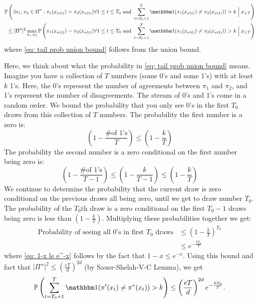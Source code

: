 \documentclass[11pt]{article}
\begin{document}
\begin{align}\label{eq: tail probability 4}
\prob{\exists \pi_1,\pi_2 \in \Pi'': \pi_1(x_{\sigma(t)})= \pi_2(x_{\sigma(t)}) \forall 1 \le t \le T_0 \text{ and }  \sum_{t=T_0+1}^T \ind(\pi_1(x_{\sigma(t)})\neq \pi_2(x_{\sigma(t)})) > k\;\Big|\;x_{1:T}} \\
\le |\Pi''|^2\max_{\pi_1,\pi_2} \prob{\pi_1(x_{\sigma(t)})= \pi_2(x_{\sigma(t)}) \forall 1 \le t \le T_0 \text{ and } \sum_{t=T_0+1}^T \ind(\pi_1(x_{\sigma(t)})\neq \pi_2(x_{\sigma(t)})) > k\;\Big|\;x_{1:T}}\label{eq: tail prob union bound}
\end{align} 
where \eqref{eq: tail prob union bound} follows from the union bound. 

Here, we think about what the probability in \eqref{eq: tail prob union bound} means. Imagine you have a collection of $T$ numbers (some 0's and some 1's) with at least $k$ 1's. Here, the 0's represent the number of agreements between $\pi_1$ and $\pi_2$, and 1's represent the number of disagreements. The stream of 0's and 1's come in a random order. We bound the probability that you only see 0's in the first $T_0$ draws from this collection of $T$ numbers. The probability the first number is a zero is:
\begin{equation}
(1-\frac{\text{\# of 1's}}{T}) \le (1- \frac{k}{T})
\end{equation}
The probability the second number is a zero conditional on the first number being zero is:
\begin{equation}
(1-\frac{\text{\# of 1's}}{T-1}) \le (1-\frac{k}{T-1}) \le (1 - \frac{k}{T})
\end{equation}
We continue to determine the probability that the current draw is zero conditional on the previous draws all being zero, until we get to draw number $T_0$. The probability of the $T_0${th} draw is a zero conditional on the first $T_0-1$ draws being zero is less than $(1-\frac{k}{T})$. Multiplying these probabilities together we get:
\begin{align}
\text{Probability of seeing all 0's in first } T_0 \text{ draws} &\le (1-\frac{k}{T})^{T_0}\\
&\le e^{-\frac{kT_0}{T}} \label{eq: 1-x le e^-x}
\end{align}
where \eqref{eq: 1-x le e^-x} follows by the fact that $1-x \le e^{-x}$.
Using this bound and fact that $|\Pi''|^2 \le (\frac{eT}{d})^{2d}$ (by Sauer-Shelah-V-C Lemma), we get
\begin{equation}\label{eq:tailboundfinal}
\prob{\sum_{t=T_0+1}^T\ind(\pi'(x_t)\neq \pi^*(x_t))>k} \le \left(\frac{eT}{d}\right)^{2d} e^{-\frac{kT_0}{T}} .
\end{equation}
\end{document}
